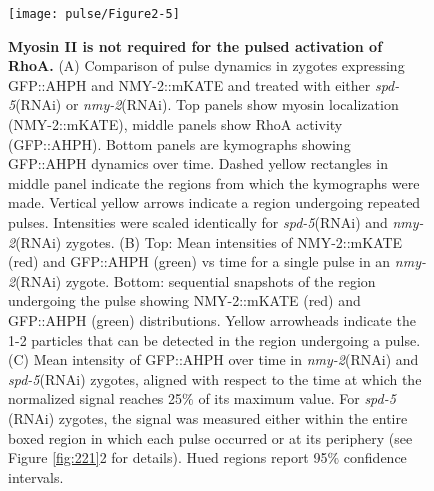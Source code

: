 \begin{figure}[!htbp]
\centering
\texttt{[image: pulse/Figure2-5]}

\caption[Myosin II is not required for the pulsed activation of RhoA.]{\label{fig:225}\textbf{Myosin II is not required for the pulsed activation of RhoA.} (A) Comparison of pulse dynamics in zygotes expressing GFP::AHPH and NMY-2::mKATE and treated with either \textit{spd-5}(RNAi) or \textit{nmy-2}(RNAi). Top panels show myosin localization (NMY-2::mKATE), middle panels show RhoA activity (GFP::AHPH). Bottom panels are kymographs showing GFP::AHPH dynamics over time.  Dashed yellow rectangles in middle panel indicate the regions from which the kymographs were made. Vertical yellow arrows indicate a region undergoing repeated pulses. Intensities were scaled identically for \textit{spd-5}(RNAi) and \textit{nmy-2}(RNAi) zygotes. (B) Top: Mean intensities of NMY-2::mKATE (red) and GFP::AHPH (green) vs time for a single pulse in an \textit{nmy-2}(RNAi) zygote. Bottom: sequential snapshots of the region undergoing the pulse showing NMY-2::mKATE (red) and GFP::AHPH (green) distributions. Yellow arrowheads indicate the  1-2 particles that can be detected in the region undergoing a pulse. (C) Mean intensity of GFP::AHPH over time in \textit{nmy-2}(RNAi) and \textit{spd-5}(RNAi) zygotes, aligned with respect to the time at which the normalized signal reaches 25$\%$ of its maximum value.  For \textit{spd-5} (RNAi) zygotes, the signal was measured either within the entire boxed region in which each pulse occurred  or at its periphery (see Figure \ref{fig:221}2 for details). Hued regions report 95$\%$ confidence intervals.}
\end{figure}



